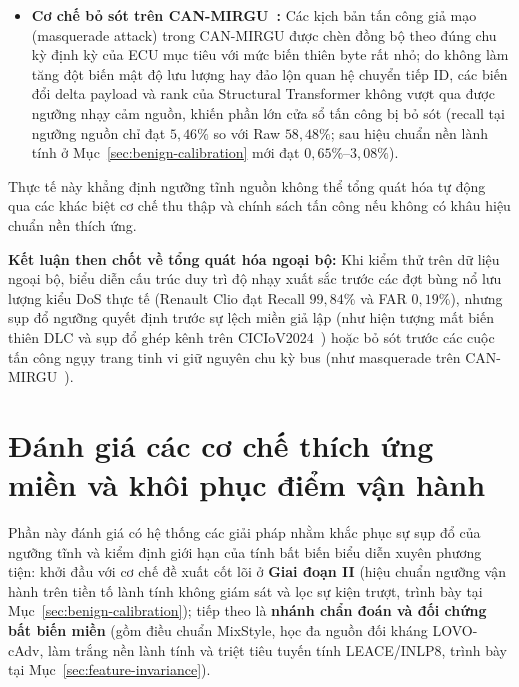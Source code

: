 \documentclass[12pt, a4paper, reqno, oneside]{book}
\begin{document}
\begin{itemize}
\begin{enumerate}
    \end{enumerate}
    \item \textbf{Cơ chế bỏ sót trên CAN-MIRGU~\cite{rajapaksha2024canmirgu}:} Các kịch bản tấn công giả mạo (masquerade attack) trong CAN-MIRGU được chèn đồng bộ theo đúng chu kỳ định kỳ của ECU mục tiêu với mức biến thiên byte rất nhỏ; do không làm tăng đột biến mật độ lưu lượng hay đảo lộn quan hệ chuyển tiếp ID, các biến đổi delta payload và rank của Structural Transformer không vượt qua được ngưỡng nhạy cảm nguồn, khiến phần lớn cửa sổ tấn công bị bỏ sót (recall tại ngưỡng nguồn chỉ đạt $5{,}46\%$ so với Raw $58{,}48\%$; sau hiệu chuẩn nền lành tính ở Mục~\ref{sec:benign-calibration} mới đạt $0{,}65\%\text{--}3{,}08\%$).
\end{itemize}
Thực tế này khẳng định ngưỡng tĩnh nguồn không thể tổng quát hóa tự động qua các khác biệt cơ chế thu thập và chính sách tấn công nếu không có khâu hiệu chuẩn nền thích ứng.

\noindent\textbf{Kết luận then chốt về tổng quát hóa ngoại bộ:} Khi kiểm thử trên dữ liệu ngoại bộ, biểu diễn cấu trúc duy trì độ nhạy xuất sắc trước các đợt bùng nổ lưu lượng kiểu DoS thực tế (Renault Clio đạt Recall $99{,}84\%$ và FAR $0{,}19\%$), nhưng sụp đổ ngưỡng quyết định trước sự lệch miền giả lập (như hiện tượng mất biến thiên DLC và sụp đổ ghép kênh trên CICIoV2024~\cite{neto2024ciciov2024}) hoặc bỏ sót trước các cuộc tấn công ngụy trang tinh vi giữ nguyên chu kỳ bus (như masquerade trên CAN-MIRGU~\cite{rajapaksha2024canmirgu}).

\section{Đánh giá các cơ chế thích ứng miền và khôi phục điểm vận hành}\label{sec:adaptation-eval}
Phần này đánh giá có hệ thống các giải pháp nhằm khắc phục sự sụp đổ của ngưỡng tĩnh và kiểm định giới hạn của tính bất biến biểu diễn xuyên phương tiện: khởi đầu với cơ chế đề xuất cốt lõi ở \textbf{Giai đoạn II} (hiệu chuẩn ngưỡng vận hành trên tiền tố lành tính không giám sát và lọc sự kiện trượt, trình bày tại Mục~\ref{sec:benign-calibration}); tiếp theo là \textbf{nhánh chẩn đoán và đối chứng bất biến miền} (gồm điều chuẩn MixStyle, học đa nguồn đối kháng LOVO-cAdv, làm trắng nền lành tính và triệt tiêu tuyến tính LEACE/INLP8, trình bày tại Mục~\ref{sec:feature-invariance}).
\end{document}
